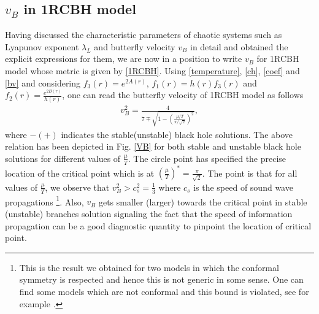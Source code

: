 \documentclass[preprintnumbers,aps,prd,longbibliography,nofootinbib,nobibnotes,amsmath,amssymb]{revtex4}
\begin{document}
\subsection{$v_B$ in 1RCBH model}
Having discussed the characteristic parameters of chaotic systems such as Lyapunov exponent $\lambda_{L}$ and butterfly velocity $v_B$ in detail and obtained the explicit expressions for them, we are now in a position to write $v_B$ for 1RCBH model whose metric is given by \eqref{1RCBH}. Using \eqref{temperature}, \eqref{ch}, \eqref{coef} and \eqref{bv} and considering $f_3(r)=e^{2A(r)}$, $f_1(r)=h(r) f_3(r)$ and $f_2(r)=\frac{e^{2B(r)}}{h(r)}$, one can read the butterfly velocity of 1RCBH model  as follows
\begin{align}
v_B^2=\frac{4}{7\mp \sqrt{1-\left(\frac{\mu /T}{\pi /\sqrt{2}}\right)^2}},
\end{align}
where $-(+)$ indicates the stable(unstable) black hole solutions. The above relation has been depicted in Fig. \ref{VB} for both stable and unstable black hole solutions for different values of $\frac{\mu}{T}$. The circle point has specified the precise location of the critical point which is at $(\frac{\mu}{T})^*=\frac{\pi}{\sqrt{2}}$. The point is that for all values of $\frac{\mu}{T}$, we observe that $v_B^2 > c_s^2 = \frac{1}{3}$ where $c_s$ is the speed of sound wave propagations \footnote{This is the result we obtained for two models in which the conformal symmetry is respected and hence this is not generic in some sense. One can find some models which are not conformal and this bound is violated, see for example \cite{Baggioli:2020ljz}.}. Also, $v_B$ gets smaller (larger) towards the critical point in stable (unstable) branches solution signaling the fact that the speed of information propagation can be a good diagnostic quantity to pinpoint the location of critical point. 
\end{document}
